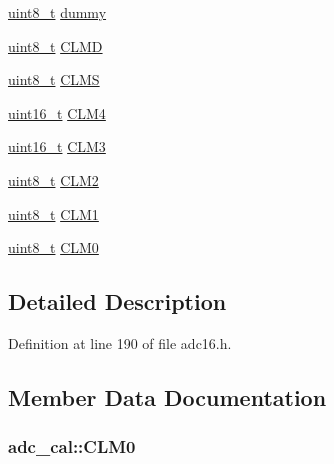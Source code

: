 \begin{DoxyCompactItemize}
\hyperlink{_p_e___types_8h_aba7bc1797add20fe3efdf37ced1182c5}{uint8\+\_\+t} \hyperlink{structadc__cal_a280be7159cd5d56e45d69825463759cf}{dummy}
\item 
\hyperlink{_p_e___types_8h_aba7bc1797add20fe3efdf37ced1182c5}{uint8\+\_\+t} \hyperlink{structadc__cal_af86916e18c3910ed96c655de9f7fc7bd}{C\+L\+MD}
\item 
\hyperlink{_p_e___types_8h_aba7bc1797add20fe3efdf37ced1182c5}{uint8\+\_\+t} \hyperlink{structadc__cal_aa14e6348c8e56b4f43b23f99db7095de}{C\+L\+MS}
\item 
\hyperlink{_p_e___types_8h_a1f1825b69244eb3ad2c7165ddc99c956}{uint16\+\_\+t} \hyperlink{structadc__cal_aa3ecafcea2cb0997c6b66f5603d9ea4b}{C\+L\+M4}
\item 
\hyperlink{_p_e___types_8h_a1f1825b69244eb3ad2c7165ddc99c956}{uint16\+\_\+t} \hyperlink{structadc__cal_a2a78a7737f09b2158107fdcb7c71dc07}{C\+L\+M3}
\item 
\hyperlink{_p_e___types_8h_aba7bc1797add20fe3efdf37ced1182c5}{uint8\+\_\+t} \hyperlink{structadc__cal_add50b0a700826ae47b2eef58e770a962}{C\+L\+M2}
\item 
\hyperlink{_p_e___types_8h_aba7bc1797add20fe3efdf37ced1182c5}{uint8\+\_\+t} \hyperlink{structadc__cal_a3edc880bcdacf87e86d1464d8685779d}{C\+L\+M1}
\item 
\hyperlink{_p_e___types_8h_aba7bc1797add20fe3efdf37ced1182c5}{uint8\+\_\+t} \hyperlink{structadc__cal_aefd04f597f0a5c533d58e103ab41e3a5}{C\+L\+M0}
\end{DoxyCompactItemize}


\subsection{Detailed Description}


Definition at line 190 of file adc16.\+h.



\subsection{Member Data Documentation}
\subsubsection[{\texorpdfstring{C\+L\+M0}{CLM0}}]{ adc\+\_\+cal\+::\+C\+L\+M0}\hypertarget{structadc__cal_aefd04f597f0a5c533d58e103ab41e3a5}{}\label{structadc__cal_aefd04f597f0a5c533d58e103ab41e3a5}


